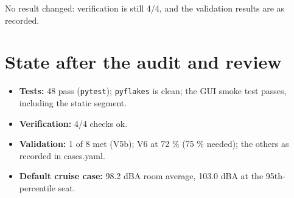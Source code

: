 \documentclass[10pt,a4paper]{article}
\begin{document}
No result changed: verification is still 4/4, and the validation results are as recorded.

\section*{State after the audit and review}

\begin{itemize}
\item \textbf{Tests:} 48 pass (\texttt{pytest}); \texttt{pyflakes} is clean; the GUI smoke test passes, including the static segment.
\item \textbf{Verification:} 4/4 checks ok.
\item \textbf{Validation:} 1 of 8 met (V5b); V6 at 72 \% (75 \% needed); the others as recorded in cases.yaml.
\item \textbf{Default cruise case:} 98.2 dBA room average, 103.0 dBA at the 95th-percentile seat.
\end{itemize}
\end{document}
